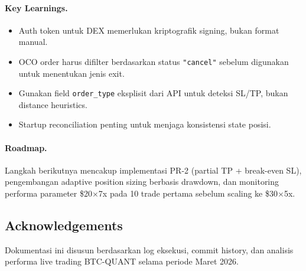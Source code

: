 \documentclass[10pt,a4paper]{article}
\begin{document}
\paragraph{Key Learnings.}
\begin{itemize}
    \item Auth token untuk DEX memerlukan kriptografik signing, bukan format manual.
    \item OCO order harus difilter berdasarkan status \texttt{"cancel"} sebelum
          digunakan untuk menentukan jenis exit.
    \item Gunakan field \texttt{order\_type} eksplisit dari API untuk deteksi SL/TP,
          bukan distance heuristics.
    \item Startup reconciliation penting untuk menjaga konsistensi state posisi.
\end{itemize}

\paragraph{Roadmap.}
Langkah berikutnya mencakup implementasi PR-2 (partial TP + break-even SL),
pengembangan adaptive position sizing berbasis drawdown, dan monitoring performa
parameter \$20$\times$7x pada 10 trade pertama sebelum scaling ke \$30$\times$5x.

\subsection*{Acknowledgements}
Dokumentasi ini disusun berdasarkan log eksekusi, commit history, dan analisis
performa live trading BTC-QUANT selama periode Maret 2026.
\end{document}
